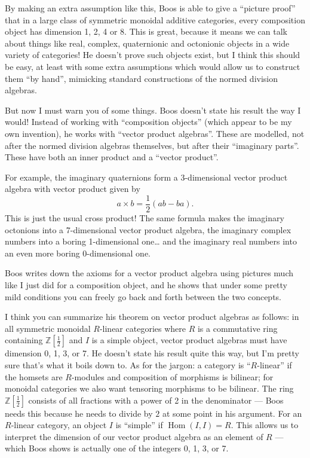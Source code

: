\documentclass{article}
\begin{document}
By making an extra assumption like this, Boos is able to give a
``picture proof'' that in a large class of symmetric monoidal additive
categories, every composition object has dimension 1, 2, 4 or 8. This is
great, because it means we can talk about things like real, complex,
quaternionic and octonionic objects in a wide variety of categories! He
doesn't prove such objects exist, but I think this should be easy, at
least with some extra assumptions which would allow us to construct them
``by hand'', mimicking standard constructions of the normed division
algebras.

But now I must warn you of some things. Boos doesn't state his result
the way I would! Instead of working with ``composition objects'' (which
appear to be my own invention), he works with ``vector product
algebras''. These are modelled, not after the normed division algebras
themselves, but after their ``imaginary parts''. These have both an
inner product and a ``vector product''.

For example, the imaginary quaternions form a 3-dimensional vector
product algebra with vector product given by
\[a\times b = \frac12(ab - ba).\] This is just the usual cross product!
The same formula makes the imaginary octonions into a 7-dimensional
vector product algebra, the imaginary complex numbers into a boring
1-dimensional one\ldots{} and the imaginary real numbers into an even
more boring 0-dimensional one.

Boos writes down the axioms for a vector product algebra using pictures
much like I just did for a composition object, and he shows that under
some pretty mild conditions you can freely go back and forth between the
two concepts.

I think you can summarize his theorem on vector product algebras as
follows: in all symmetric monoidal \(R\)-linear categories where \(R\)
is a commutative ring containing \(\mathbb{Z}[\frac12]\) and \(I\) is a
simple object, vector product algebras must have dimension 0, 1, 3, or
7. He doesn't state his result quite this way, but I'm pretty sure
that's what it boils down to. As for the jargon: a category is
``\(R\)-linear'' if the homsets are \(R\)-modules and composition of
morphisms is bilinear; for monoidal categories we also want tensoring
morphisms to be bilinear. The ring \(\mathbb{Z}[\frac12]\) consists of
all fractions with a power of 2 in the denominator --- Boos needs this
because he needs to divide by \(2\) at some point in his argument. For
an \(R\)-linear category, an object \(I\) is ``simple'' if
\(\operatorname{Hom}(I,I) = R\). This allows us to interpret the
dimension of our vector product algebra as an element of \(R\) --- which
Boos shows is actually one of the integers 0, 1, 3, or 7.
\end{document}
